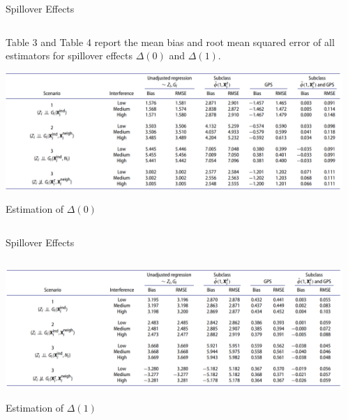 \documentclass[notes,11pt, aspectratio=169]{beamer}
\begin{document}
\begin{frame}{Spillover Effects}
\begin{columns}[T] %
\begin{column}{\textwidth}
  \begin{wideitemize}
  \item  Table 3 and Table 4 report the mean bias and root mean squared error of all estimators for spillover effects $\Delta(0)$ and $\Delta(1)$.  
   \begin{table}[h]
   \centering
   \includegraphics[scale=0.45]{table3.png}
   \caption{Estimation of  $\Delta(0)$}
   \label{tab:tab3}
   \end{table}
  \end{wideitemize}
\end{column}%
\hfill%
\begin{column}{.38\textwidth}
  \vspace{20pt}
  \vspace{20pt}
\end{column}%
\end{columns}
\end{frame}


\begin{frame}{Spillover Effects}
\begin{columns}[T] %
\begin{column}{\textwidth}
  \begin{wideitemize}
   \begin{table}[h]
   \centering
   \includegraphics[scale=0.45]{table4.png}
   \caption{Estimation of  $\Delta(1)$}
   \label{tab:tab4}
   \end{table}
  \end{wideitemize}
\end{column}%
\hfill%
\begin{column}{.38\textwidth}
  \vspace{20pt}
  \vspace{20pt}
\end{column}%
\end{columns}
\end{frame}
\end{document}
